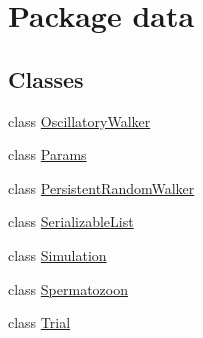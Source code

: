 \hypertarget{namespacedata}{}\section{Package data}
\label{namespacedata}
\subsection*{Classes}
\begin{DoxyCompactItemize}
\item 
class \hyperlink{classdata_1_1_oscillatory_walker}{Oscillatory\+Walker}
\item 
class \hyperlink{classdata_1_1_params}{Params}
\item 
class \hyperlink{classdata_1_1_persistent_random_walker}{Persistent\+Random\+Walker}
\item 
class \hyperlink{classdata_1_1_serializable_list}{Serializable\+List}
\item 
class \hyperlink{classdata_1_1_simulation}{Simulation}
\item 
class \hyperlink{classdata_1_1_spermatozoon}{Spermatozoon}
\item 
class \hyperlink{classdata_1_1_trial}{Trial}
\end{DoxyCompactItemize}
